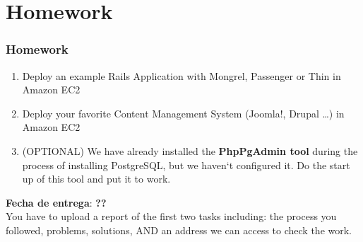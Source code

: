\documentclass{beamer}
\begin{document}
\section{Homework}
\begin{frame}
  \frametitle{Homework}
  \begin{enumerate}
    \item Deploy an example Rails Application with Mongrel, Passenger or Thin in Amazon EC2
    \item Deploy your favorite Content Management System (Joomla!, Drupal \dots) in Amazon EC2
    \item (OPTIONAL) We have already installed the \textbf{PhpPgAdmin tool} during the process of installing PostgreSQL, but we haven`t configured it.
     Do the start up of this tool and put it to work.
  \end{enumerate}

\textbf{Fecha de entrega}: \textbf{??}\\
You have to upload a report of the first two tasks including: the process you followed, problems, solutions, AND an address we can access to check the work.
\end{frame}
\end{document}
